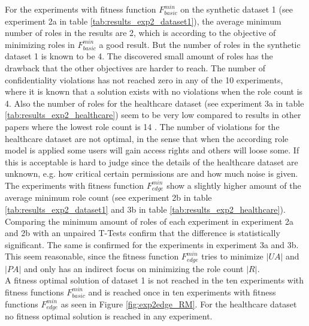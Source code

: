 For the experiments with fitness function $F_{basic}^{min}$ on the synthetic dataset 1 (see experiment 2a in table \ref{tab:results_exp2_dataset1}), the average minimum number of roles in the results are 2, which is according to the objective of minimizing roles in $F_{basic}^{min}$ a good result. But the number of roles in the synthetic dataset 1 is known to be 4. The discovered small amount of roles has the drawback that the other objectives are harder to reach. The number of confidentiality violations has not reached zero in any of the 10 experiments, where it is known that a solution exists with no violations when the role count is 4. Also the number of roles for the healthcare dataset (see experiment 3a in table \ref{tab:results_exp2_healthcare}) seem to be very low compared to results in other papers where the lowest role count is 14 \cite{Ene}\cite{Molloy:2009:ERM:1542207.1542224}. The number of violations for the healthcare dataset are not optimal, in the sense that when the according role model is applied some users will gain access rights and others will loose some. If this is acceptable is hard to judge since the details of the healthcare dataset are unknown, e.g. how critical certain permissions are and how much noise is given.\\
The experiments with fitness function $F_{edge}^{min}$ show a slightly higher amount of the average minimum role count (see experiment 2b in table \ref{tab:results_exp2_dataset1} and 3b in table \ref{tab:results_exp2_healthcare}). Comparing the minimum amount of roles of each experiment in experiment 2a and 2b with an unpaired T-Tests confirm that the difference is statistically significant. The same is confirmed for the experiments in experiment 3a and 3b. This seem reasonable, since the fitness function $F_{edge}^{min}$ tries to minimize $|UA|$ and $|PA|$ and only has an indirect focus on minimizing the role count $|R|$.\\
A fitness optimal solution of dataset 1 is not reached in the ten experiments with fitness functions $F_{basic}^{min}$ and is reached once in ten experiments with fitness functions $F_{edge}^{min}$ as seen in Figure \ref{fig:exp2edge_RM}. For the healthcare dataset no fitness optimal solution is reached in any experiment.\\

